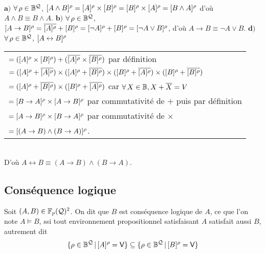 		\begin{Correction} \\
			\(\bm{a)}\) \(\forall \, \rho \in \mathbb{B}^{\mathcal{Q}}\), \([A \wedge B]^{\rho} = [A]^{\rho} \times [B]^{\rho} = [B]^{\rho} \times [A]^{\rho} = [B \wedge A]^{\rho}\) d'où \(A \wedge B \equiv B \wedge A\). \nt
			\(\bm{b)}\) \(\forall \, \rho \in \mathbb{B}^{\mathcal{Q}}\), \([A \rightarrow B]^{\rho} = \overline{[A]^{\rho}} + [B]^{\rho} = [\neg A]^{\rho} + [B]^{\rho} = [\neg A \vee B]^{\rho}\), d'où \(A \rightarrow B \equiv \neg A \vee B\). \nt
			\(\bm{d)}\) \(\forall \, \rho \in \mathbb{B}^{\mathcal{Q}}\), \([A \leftrightarrow B]^{\rho}\)\!
				\begin{tabular}[t]{l}
					\(= ([A]^{\rho} \times [B]^{\rho}) + (\overline{[A]^{\rho}} \times \overline{[B]^{\rho}})\) par définition \\
					\(= ([A]^{\rho} + \overline{[A]^{\rho}}) \times ([A]^{\rho} + \overline{[B]^{\rho}}) \times ([B]^{\rho} + \overline{[A]^{\rho}}) \times ([B]^{\rho} + \overline{[B]^{\rho}})\) \\
					\(= ([A]^{\rho} + \overline{[B]^{\rho}}) \times ([B]^{\rho} + \overline{[A]^{\rho}})\) car \(\forall \, X \in \mathbb{B}, X + \overline{X} = V\) \\
					\(= [B \rightarrow A]^{\rho} \times [A \rightarrow B]^{\rho}\) par commutativité de \(+\) puis par définition \\
					\(= [A \rightarrow B]^{\rho} \times [B \rightarrow A]^{\rho}\) par commutativité de \(\times\) \\
					\(= [(A \rightarrow B) \wedge (B \rightarrow A)]^{\rho}\).
				\end{tabular} \\[1mm]
			D'où \(A \leftrightarrow B \equiv (A \rightarrow B) \wedge (B \rightarrow A)\).
		\end{Correction}
		
		\pagebreak
		
	\subsection{Conséquence logique}
		
		\begin{Definition}
			Soit \((A,B) \in \mathbb{F}_p(\mathcal{Q})^2\). On dit que \(B\) est conséquence logique de \(A\), ce que l'on note \(A \vDash B\), ssi tout environnement propositionnel satisfaisant \(A\) satisfait aussi \(B\), autrement dit
				\[
					\{\rho \in \mathbb{B}^{\mathcal{Q}} \, | \, [A]^\rho = \text{\sf{V}}\} \subseteq \{\rho \in \mathbb{B}^{\mathcal{Q}} \, | \, [B]^\rho = \text{\sf{V}}\}
				\]
		\end{Definition}
		
